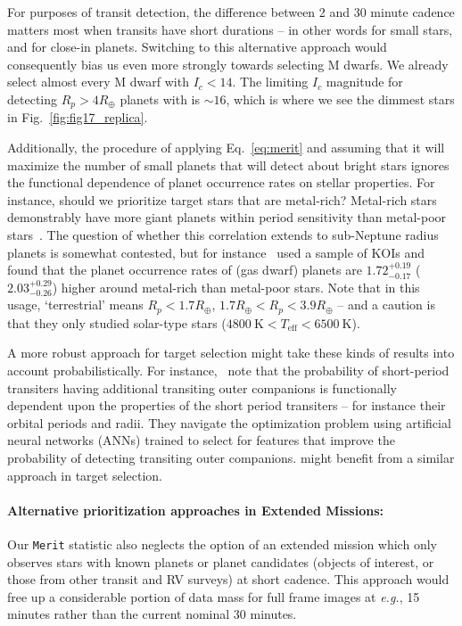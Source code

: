 For purposes of transit detection, the difference between 2 and 30
minute cadence matters most when transits have short durations -- in
other words for small stars, and for close-in planets.  Switching to
this alternative approach would consequently bias us even more
strongly towards selecting M dwarfs.  We already select almost every M
dwarf with $I_c < 14$.  The limiting $I_c$ magnitude for detecting
$R_p > 4R_\oplus$ planets with \tess is $\sim 16$, which is where we
see the dimmest stars in Fig.~\ref{fig:fig17_replica}.

Additionally, the procedure of applying Eq.~\ref{eq:merit} and
assuming that it will maximize the number of small planets that \tess
will detect about bright stars ignores the functional dependence of
planet occurrence rates on stellar properties.  For instance, should
we prioritize target stars that are metal-rich?  Metal-rich stars
demonstrably have more giant planets within \tesss period sensitivity
than metal-poor
stars~\citep{fischer_planet-metallicity_2005,johnson_giant_2010}.  The
question of whether this correlation extends to sub-Neptune radius
planets is somewhat contested, but for
instance~\citet{wang_revealing_2015} used a sample of KOIs and found
that the planet occurrence rates of (gas dwarf) planets are
$1.72^{+0.19}_{-0.17}$ ($2.03^{+0.29}_{-0.26}$) higher around
metal-rich than metal-poor stars.  Note that in this usage,
`terrestrial' means $R_p<1.7R_\oplus$, $1.7R_\oplus < R_p <
3.9R_\oplus$ -- and a caution is that they only studied solar-type
stars ($4800\ \mathrm{K}<T_\mathrm{eff}<6500\ \mathrm{K}$).

A more robust approach for \tesss target selection might take these
kinds of results into account probabilistically.  For
instance,~\protect\citet{kipping_transit_2016} note that the
probability of short-period transiters having additional transiting
outer companions is functionally dependent upon the properties of the
short period transiters -- for instance their orbital periods and
radii.  They navigate the optimization problem using artificial neural
networks (ANNs) trained to select for features that improve the
probability of detecting transiting outer companions.  \tess might
benefit from a similar approach in target selection.

\paragraph{Alternative prioritization approaches in Extended Missions:}
Our \texttt{Merit} statistic also neglects the option of an extended
mission which only observes stars with known planets or planet
candidates (\tesss objects of interest, or those from other transit
and RV surveys) at short cadence.  This approach would free up a
considerable portion of \tesss data mass for full frame images at
\textit{e.g.}, 15 minutes rather than the current nominal 30 minutes.

